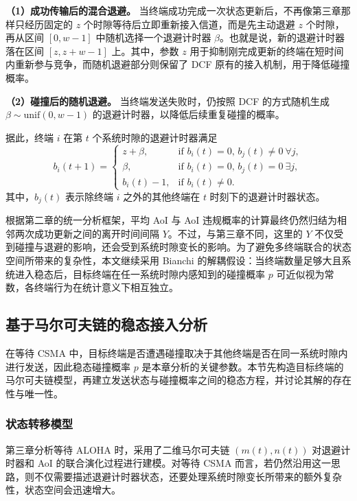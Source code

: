 \textbf{（1）成功传输后的混合退避。} 当终端成功完成一次状态更新后，不再像第三章那样只经历固定的 $z$ 个时隙等待后立即重新接入信道，而是先主动退避 $z$ 个时隙，再从区间 $[0,w-1]$ 中随机选择一个退避计时器 $\beta$。也就是说，新的退避计时器落在区间 $[z,z+w-1]$ 上。其中，参数 $z$ 用于抑制刚完成更新的终端在短时间内重新参与竞争，而随机退避部分则保留了 DCF 原有的接入机制，用于降低碰撞概率。

\textbf{（2）碰撞后的随机退避。} 当终端发送失败时，仍按照 DCF 的方式随机生成 $\beta \sim \text{unif}(0,w-1)$ 的退避计时器，以降低后续重复碰撞的概率。

据此，终端 $i$ 在第 $t$ 个系统时隙的退避计时器满足
\begin{equation}\label{cp4_backoff_counter_evolution}
    b_i(t + 1) =
\begin{cases}
z + \beta, & \text{if } b_i(t) = 0, \, b_j(t) \neq 0 \ \forall j, \\
\beta, & \text{if } b_i(t) = 0, \, b_j(t) = 0 \ \exists j, \\
b_i(t) - 1, & \text{if } b_i(t) \neq 0.
\end{cases}
\end{equation}
其中，$b_j(t)$ 表示除终端 $i$ 之外的其他终端在 $t$ 时刻下的退避计时器状态。

根据第二章的统一分析框架，平均 AoI 与 AoI 违规概率的计算最终仍然归结为相邻两次成功更新之间的离开时间间隔 $Y$。不过，与第三章不同，这里的 $Y$ 不仅受到碰撞与退避的影响，还会受到系统时隙变长的影响。为了避免多终端联合的状态空间所带来的复杂性，本文继续采用 Bianchi 的解耦假设：当终端数量足够大且系统进入稳态后，目标终端在任一系统时隙内感知到的碰撞概率 $p$ 可近似视为常数，各终端行为在统计意义下相互独立。

\subsection{基于马尔可夫链的稳态接入分析}

在等待 CSMA 中，目标终端是否遭遇碰撞取决于其他终端是否在同一系统时隙内进行发送，因此稳态碰撞概率 $p$ 是本章分析的关键参数。本节先构造目标终端的马尔可夫链模型，再建立发送状态与碰撞概率之间的稳态方程，并讨论其解的存在性与唯一性。

\subsubsection{状态转移模型}

第三章分析等待 ALOHA 时，采用了二维马尔可夫链 $(m(t),n(t))$ 对退避计时器和 AoI 的联合演化过程进行建模。对等待 CSMA 而言，若仍然沿用这一思路，则不仅需要描述退避计时器状态，还要处理系统时隙变长所带来的额外复杂性，状态空间会迅速增大。

